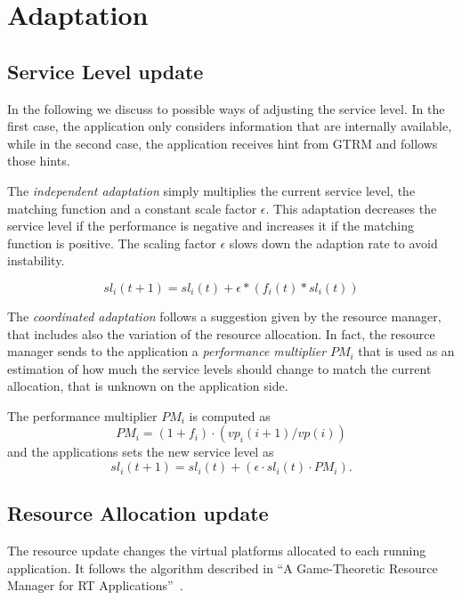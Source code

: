 \documentclass[nobiblatex]{LTHthesis}
\begin{document}
\section{Adaptation}

\subsection{Service Level update}
In the following we discuss to possible ways of adjusting the service level.
In the first case, the application only considers information that are
internally available, while in the second case, the application receives
hint from GTRM and follows those hints.

The \emph{independent adaptation} simply multiplies the current service level,
the matching function and a constant scale factor $\epsilon$. This adaptation
decreases the service level if the performance is negative and increases it 
if the matching function is positive. The scaling factor $\epsilon$ slows 
down the adaption rate to avoid instability. 

\begin{equation}
sl_i(t+1)= sl_i(t) + \epsilon*(f_i(t)*sl_i(t))
\label{eq:servicelevelsimple}
\end{equation}

The \emph{coordinated adaptation} follows a suggestion given by the resource
manager, that includes also the variation of the resource allocation. In fact,
the resource manager sends to the application a \emph{performance multiplier}
$PM_i$ that is used as an estimation of how much the service levels should
change to match the current allocation, that is unknown on the application
side.

The performance multiplier $PM_i$ is computed as
\begin{equation}
PM_i = (1+f_i) \cdot (vp_i(i+1)/vp(i))
\end{equation}
and the applications sets the new service level as
\begin{equation}
sl_i(t+1) = sl_i(t) + (\epsilon \cdot sl_i(t) \cdot PM_i).
\label{eq:servicelevelnotsimple}
\end{equation}

\subsection{Resource Allocation update}

The resource update changes the virtual platforms allocated to each running
application. It follows the algorithm described in 
``A Game-Theoretic Resource Manager for RT Applications''~\cite[page 4]{gtrm}.
\end{document}
